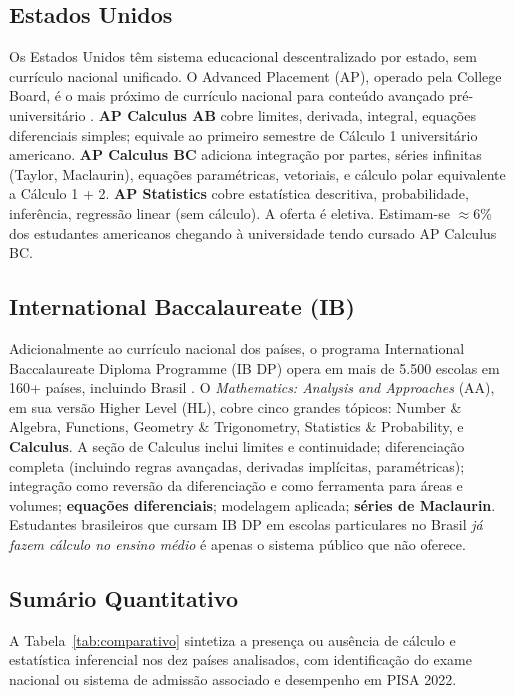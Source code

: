 \documentclass[12pt,a4paper,oneside]{article}
\begin{document}
\subsection{Estados Unidos}

Os Estados Unidos têm sistema educacional descentralizado por
estado, sem currículo nacional unificado. O Advanced Placement
(AP), operado pela College Board, é o mais próximo de currículo
nacional para conteúdo avançado pré-universitário
\cite{ref:ap-calculus,ref:ap-statistics}. \textbf{AP Calculus AB}
cobre limites, derivada, integral, equações diferenciais simples;
equivale ao primeiro semestre de Cálculo 1 universitário americano.
\textbf{AP Calculus BC} adiciona integração por partes, séries
infinitas (Taylor, Maclaurin), equações paramétricas, vetoriais, e
cálculo polar \textemdash{} equivalente a Cálculo 1 + 2.
\textbf{AP Statistics} cobre estatística descritiva, probabilidade,
inferência, regressão linear (sem cálculo). A oferta é eletiva.
Estimam-se $\approx$6\% dos estudantes americanos chegando à
universidade tendo cursado AP Calculus BC.

\subsection{International Baccalaureate (IB)}

Adicionalmente ao currículo nacional dos países, o programa
International Baccalaureate Diploma Programme (IB DP) opera em mais
de 5.500 escolas em 160+ países, incluindo Brasil
\cite{ref:ibo-aa,ref:ib-master}. O \emph{Mathematics: Analysis and
Approaches} (AA), em sua versão Higher Level (HL), cobre cinco
grandes tópicos: Number \& Algebra, Functions, Geometry \&
Trigonometry, Statistics \& Probability, e \textbf{Calculus}. A
seção de Calculus inclui limites e continuidade; diferenciação
completa (incluindo regras avançadas, derivadas implícitas,
paramétricas); integração como reversão da diferenciação e como
ferramenta para áreas e volumes; \textbf{equações diferenciais};
modelagem aplicada; \textbf{séries de Maclaurin}. Estudantes
brasileiros que cursam IB DP em escolas particulares no Brasil
\emph{já fazem cálculo no ensino médio} \textemdash{} é apenas o
sistema público que não oferece.

\subsection{Sumário Quantitativo}

A Tabela~\ref{tab:comparativo} sintetiza a presença ou ausência de
cálculo e estatística inferencial nos dez países analisados, com
identificação do exame nacional ou sistema de admissão associado e
desempenho em PISA 2022.
\end{document}

